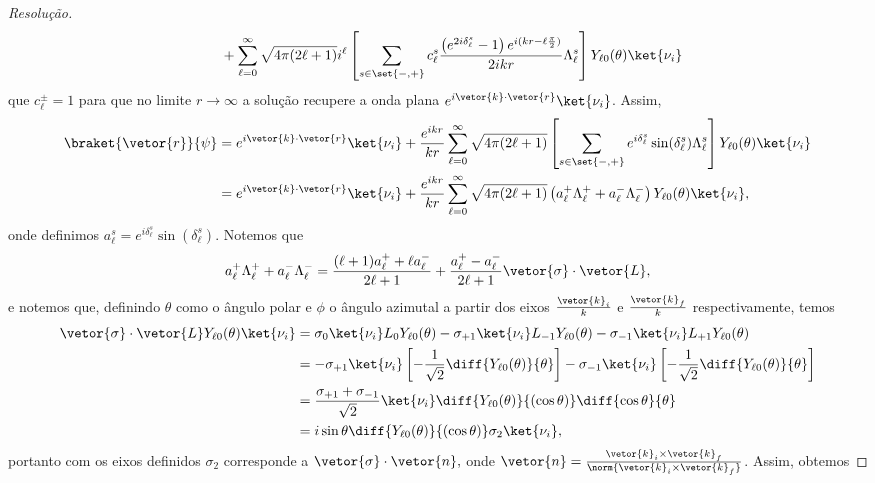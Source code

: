 \begin{proof}[Resolução]
\begin{align*}
      &{}\phantom{\mathop{\sim}^{r\to\infty} + } + \sum_{\ell = 0}^\infty \sqrt{4\pi(2\ell + 1)} i^{\ell} \left[\sum_{s \in\set{-,+}}c_\ell^s \frac{\left(e^{2i \delta_{\ell}^s} - 1\right)e^{i(kr - \ell \frac\pi2)}}{2ikr}\Lambda^s_\ell\right] Y_{\ell 0}(\theta) \ket{\nu_i}
   \end{align*}
   que \(c_\ell^{\pm} = 1\) para que no limite \(r \to \infty\) a solução recupere a onda plana \(e^{i\vetor{k}\cdot\vetor{r}}\ket{\nu_i}\). Assim,
   \begin{align*}
      \braket{\vetor{r}}{\psi} 
      &= e^{i \vetor{k}\cdot\vetor{r}} \ket{\nu_i} + \frac{e^{ikr}}{kr}\sum_{\ell = 0}^\infty \sqrt{4\pi(2\ell + 1)} \left[\sum_{s \in \set{-,+}} e^{i \delta_{\ell}^s}\sin(\delta_{\ell}^s) \Lambda_{\ell}^{s}\right] Y_{\ell 0}(\theta)\ket{\nu_i}\\
      &= e^{i \vetor{k}\cdot\vetor{r}} \ket{\nu_i} + \frac{e^{ikr}}{kr}\sum_{\ell = 0}^\infty \sqrt{4\pi(2\ell + 1)}  \left(a_{\ell}^+ \Lambda_\ell^+ + a_{\ell}^- \Lambda_\ell^-\right)Y_{\ell 0}(\theta)\ket{\nu_i},
   \end{align*}
   onde definimos \(a_{\ell}^s = e^{i \delta_{\ell}^s} \sin(\delta_{\ell}^{s}).\) Notemos que
   \begin{equation*}
      a_\ell^+ \Lambda_{\ell}^+ + a_{\ell}^- \Lambda_{\ell}^- = \frac{(\ell + 1)a_{\ell}^+ + \ell a_{\ell}^{-}}{2\ell + 1} + \frac{a_{\ell}^+ - a_{\ell}^{-}}{2\ell + 1} \vetor{\sigma}\cdot\vetor{L},
   \end{equation*}
   e notemos que, definindo \(\theta\) como o ângulo polar e \(\phi\) o ângulo azimutal a partir dos eixos \(\frac{\vetor{k}_i}{k}\) e \(\frac{\vetor{k}_f}{k}\) respectivamente, temos
   \begin{align*}
      \vetor{\sigma}\cdot \vetor{L} Y_{\ell 0}(\theta) \ket{\nu_i} 
      &= \sigma_0\ket{\nu_i} L_0 Y_{\ell 0}(\theta) - \sigma_{+1}\ket{\nu_i} L_{-1} Y_{\ell 0}(\theta) - \sigma_{-1}\ket{\nu_i} L_{+1}Y_{\ell 0}(\theta)\\
      &= - \sigma_{+1}\ket{\nu_i} \left[- \frac{1}{\sqrt{2}}\diff{Y_{\ell 0}(\theta)}{\theta}\right] - \sigma_{-1} \ket{\nu_i} \left[- \frac{1}{\sqrt{2}}\diff{Y_{\ell 0}(\theta)}{\theta}\right]\\
      &= \frac{\sigma_{+1} + \sigma_{-1}}{\sqrt{2}} \ket{\nu_i} \diff{Y_{\ell 0}(\theta)}{(\cos\theta)} \diff{\cos\theta}{\theta}\\
      &= i  \sin\theta\diff{Y_{\ell 0}(\theta)}{(\cos\theta)}\sigma_2 \ket{\nu_i},
   \end{align*}
   portanto com os eixos definidos \(\sigma_2\) corresponde a \(\vetor{\sigma} \cdot \vetor{n},\) onde \(\vetor{n} = \frac{\vetor{k}_i \times \vetor{k}_f}{\norm{\vetor{k}_i\times\vetor{k}_f}}\). Assim, obtemos

\end{proof}
